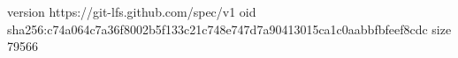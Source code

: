 version https://git-lfs.github.com/spec/v1
oid sha256:c74a064c7a36f8002b5f133c21c748e747d7a90413015ca1c0aabbfbfeef8cdc
size 79566
